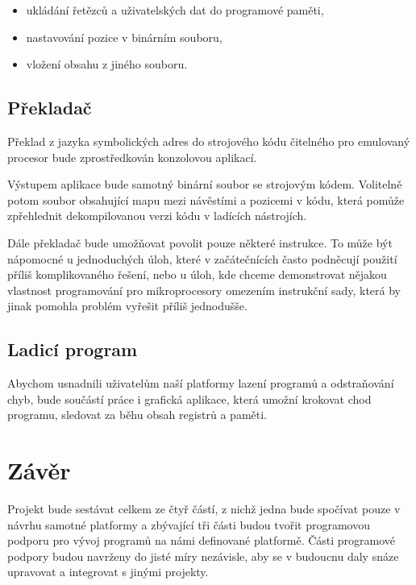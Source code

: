 \begin{itemize}
	\item ukládání řetězců a uživatelských dat do programové paměti,
	\item nastavování pozice v binárním souboru,
	\item vložení obsahu z jiného souboru.
\end{itemize}

\subsection{Překladač}

Překlad z jazyka symbolických adres do strojového kódu čitelného pro emulovaný procesor bude zprostředkován konzolovou aplikací.

Výstupem aplikace bude samotný binární soubor se strojovým kódem. Volitelně potom soubor obsahující mapu mezi návěstími a pozicemi v kódu, která pomůže zpřehlednit dekompilovanou verzi kódu v ladících nástrojích.

Dále překladač bude umožňovat povolit pouze některé instrukce. To může být nápomocné u jednoduchých úloh, které v začátečnících často podněcují použití příliš komplikovaného řešení, nebo u úloh, kde chceme demonstrovat nějakou vlastnost programování pro mikroprocesory omezením instrukční sady, která by jinak pomohla problém vyřešit příliš jednodušše.

\subsection{Ladicí program}

Abychom usnadnili uživatelům naší platformy lazení programů a odstraňování chyb, bude součástí práce i grafická aplikace, která umožní krokovat chod programu, sledovat za běhu obsah registrů a paměti.

\section{Závěr}

Projekt bude sestávat celkem ze čtyř částí, z nichž jedna bude spočívat pouze v návrhu samotné platformy a zbývající tři části budou tvořit programovou podporu pro vývoj programů na námi definované platformě. Části programové podpory budou navrženy do jisté míry nezávisle, aby se v budoucnu daly snáze upravovat a integrovat s jinými projekty.